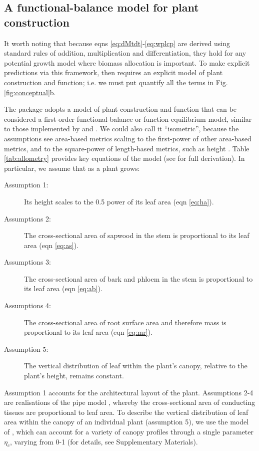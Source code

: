 \documentclass[a4paper,11pt]{article}
\begin{document}
\subsection{A functional-balance model for plant construction}

It worth noting that because eqns \ref{eq:dMtdt}-\ref{eq:wplcp} are derived using standard rules of addition, multiplication and differentiation, they hold for any potential growth model where biomass allocation is important. To make explicit predictions via this framework, then requires an explicit model of plant construction and function; i.e. we must put quantify all the terms in Fig. \ref{fig:conceptual}b.

The {\plant} package adopts a model of plant construction and function that can be considered a first-order functional-balance or function-equilibrium model, similar to those implemented by \citet{Makela-1997} and \citet{Moorcroft-2001}. We could also call it ``isometric'', because the assumptions see area-based metrics scaling to the first-power of other area-based metrics, and to the square-power of length-based metrics, such as height \citep{Huxley-1932}. Table \ref{tab:allometry} provides key equations of the model (see \citealt{Falster-2016} for full derivation). In particular, we assume that as a plant grows:
\begin{description}
\item[Assumption 1:] Its height scales to the 0.5 power of its leaf area (eqn \ref{eq:ha}).
\item[Assumptions 2:] The cross-sectional area of sapwood in the stem is proportional to its leaf area (eqn \ref{eq:as}).
\item[Assumptions 3:] The cross-sectional area of bark and phloem in the stem  is proportional to its leaf area (eqn \ref{eq:ab}).
\item[Assumptions 4:] The cross-sectional area of root surface area and therefore mass is proportional to its leaf area (eqn \ref{eq:mr}).
\item[Assumption 5:] The vertical distribution of leaf within the plant's canopy, relative to the plant's height, remains constant.
\end{description}
Assumption 1 accounts for the architectural layout of the plant. Assumptions 2-4 are realisations of the pipe model \citep{Shinozaki-1964}, whereby the cross-sectional area of conducting tissues are proportional to leaf area. To describe the vertical distribution of leaf area within the canopy of an individual plant (assumption 5), we use the model of \citet{Yokozawa-1995}, which can account for a variety of canopy profiles through a single parameter $\eta_c$, varying from 0-1 (for details, see Supplementary Materials).
\end{document}
